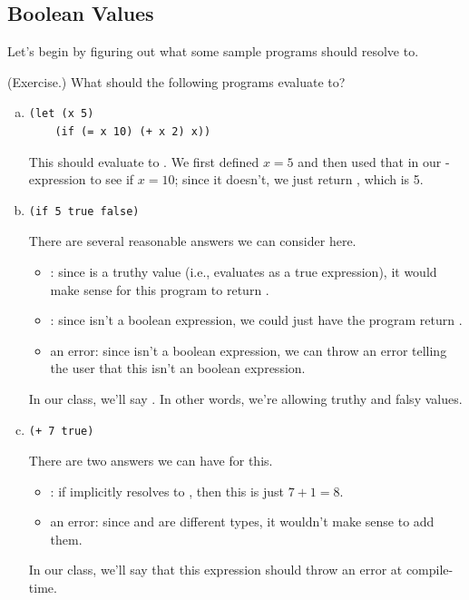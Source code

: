 \subsection{Boolean Values}
Let's begin by figuring out what some sample programs should resolve to.
\begin{mdframed}
    (Exercise.) What should the following programs evaluate to? 
    \begin{enumerate}[a.]
        \item \begin{verbatim}
(let (x 5)
    (if (= x 10) (+ x 2) x))\end{verbatim}

        \begin{mdframed}
            This should evaluate to . We first defined $x = 5$ and then used that in our -expression to see if $x = 10$; since it doesn't, we just return , which is 5.  
        \end{mdframed}


        \item \begin{verbatim}
(if 5 true false)\end{verbatim}

        \begin{mdframed}
            There are several reasonable answers we can consider here. 
            \begin{itemize}
                \item {}: since  is a truthy value (i.e., evaluates as a true expression), it would make sense for this program to return .
                \item {}: since  isn't a boolean expression, we could just have the program return .
                \item an error: since  isn't a boolean expression, we can throw an error telling the user that this isn't an boolean expression. 
            \end{itemize}
            In our class, we'll say . In other words, we're allowing truthy and falsy values.
        \end{mdframed}


        \item \begin{verbatim}
(+ 7 true)\end{verbatim}

        \begin{mdframed}
            There are two answers we can have for this. 
            \begin{itemize}
                \item {}: if  implicitly resolves to , then this is just $7 + 1 = 8$.
                \item an error: since  and  are different types, it wouldn't make sense to add them. 
            \end{itemize}
            In our class, we'll say that this expression should throw an error at compile-time.
        \end{mdframed}


\end{enumerate}
\end{mdframed}
